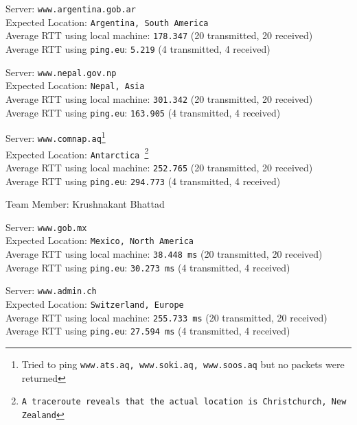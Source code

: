 \documentclass[11pt, fleqn]{article}
\begin{document}
\hrulefill
\smallskip

Server: \texttt{www.argentina.gob.ar}\\
Expected Location: \texttt{Argentina, South America}\\
Average RTT using local machine: \texttt{178.347} (20 transmitted, 20 received)\\
Average RTT using \texttt{ping.eu}: \texttt{5.219} (4 transmitted, 4 received)

\hrulefill
\smallskip

Server: \texttt{www.nepal.gov.np}\\
Expected Location: \texttt{Nepal, Asia}\\
Average RTT using local machine: \texttt{301.342} (20 transmitted, 20 received)\\
Average RTT using \texttt{ping.eu}: \texttt{163.905} (4 transmitted, 4 received)

\hrulefill
\smallskip

Server: \texttt{www.comnap.aq}\footnote{Tried to ping \texttt{www.ats.aq, www.soki.aq, www.soos.aq} but no packets were returned}\\
Expected Location: \texttt{Antarctica \footnote{A \texttt{traceroute} reveals that the actual location is Christchurch, New Zealand}}\\
Average RTT using local machine: \texttt{252.765} (20 transmitted, 20 received)\\
Average RTT using \texttt{ping.eu}: \texttt{294.773} (4 transmitted, 4 received)



\newpage


Team Member: Krushnakant Bhattad

\hrulefill
\smallskip

Server: \texttt{www.gob.mx} \\
Expected Location: \texttt{Mexico, North America}\\
Average RTT using local machine: \texttt{38.448 ms} (20 transmitted, 20 received)\\
Average RTT using \texttt{ping.eu}: \texttt{30.273 ms} (4 transmitted, 4 received)


\hrulefill
\smallskip

Server: \texttt{www.admin.ch} \\
Expected Location: \texttt{Switzerland, Europe}\\
Average RTT using local machine: \texttt{255.733 ms} (20 transmitted, 20 received)\\
Average RTT using \texttt{ping.eu}: \texttt{27.594 ms} (4 transmitted, 4 received)
\end{document}

